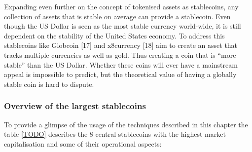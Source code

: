 \documentclass[english,]{IEEEtran}
\begin{document}
Expanding even further on the concept of tokenised assets as
stablecoins, any collection of assets that is stable on average can
provide a stablecoin. Even though the US Dollar is seen as the most
stable currency world-wide, it is still dependent on the stability of
the United States economy. To address this stablecoins like Globcoin
{[}17{]} and x8currency {[}18{]} aim to create an asset that tracks
multiple currencies as well as gold. Thus creating a coin that is ``more
stable'' than the US Dollar. Whether these coins will ever have a
mainstream appeal is impossible to predict, but the theoretical value of
having a globally stable coin is hard to dispute.

\hypertarget{overview-of-the-largest-stablecoins}{%
\subsubsection{Overview of the largest
stablecoins}\label{overview-of-the-largest-stablecoins}}

To provide a glimpse of the usage of the techniques described in this
chapter the table \ref{TODO} describes the 8 central stablecoins with
the highest market capitalisation and some of their operational aspects:
\end{document}
